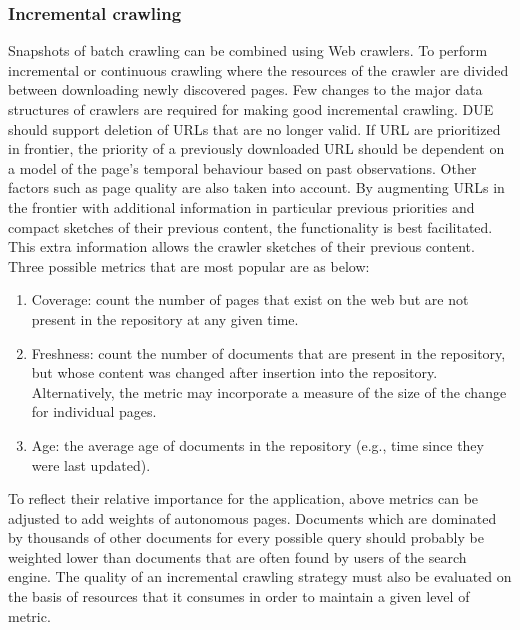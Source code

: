 \documentclass[article,type=msc,colorback,accentcolor=tud9c,twoside,11pt]{tudthesis}
\begin{document}
\subsubsection{Incremental crawling}
Snapshots of batch crawling can be combined using Web crawlers. To perform incremental or continuous crawling where the resources of the crawler are divided between downloading newly discovered pages. Few changes to the major data structures of crawlers are required for making good incremental crawling. DUE should support deletion of URLs that are no longer valid. If URL are prioritized in frontier, the priority of a previously downloaded URL should be dependent on a model of the page's temporal behaviour based on past observations. Other factors such as page quality are also taken into account. By augmenting URLs in the frontier with additional information in particular previous priorities and compact sketches of their previous content, the functionality is best facilitated. This extra information allows the crawler sketches of their previous content. Three possible metrics that are most popular are as below:
\begin{enumerate}
	\item Coverage: count the number of pages that exist on the web but are not present in the repository at any given time.
	\item Freshness: count the number of documents that are present in the repository, but whose content was
	changed after insertion into the repository. Alternatively, the metric may incorporate a measure of the
	size of the change for individual pages.
	\item Age: the average age of documents in the repository (e.g., time since they were last updated).
\end{enumerate}
To reflect their relative importance for the application, above metrics can be adjusted to add weights of autonomous pages. Documents which are dominated by thousands of other documents for every possible query should probably be weighted lower than documents that are often found by users of the search engine. The quality of an incremental crawling strategy must also be evaluated on the basis of resources that it consumes in order to maintain a given level of metric.
\end{document}
